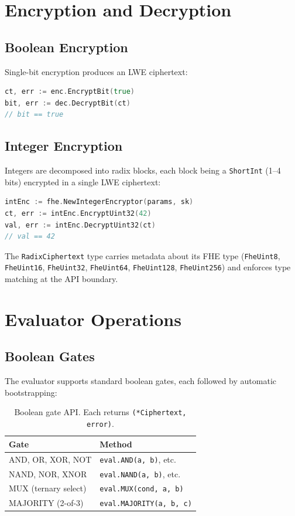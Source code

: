 \documentclass[11pt]{article}
\begin{document}
\section{Encryption and Decryption}

\subsection{Boolean Encryption}

Single-bit encryption produces an LWE ciphertext:

\begin{lstlisting}[language=Go]
ct, err := enc.EncryptBit(true)
bit, err := dec.DecryptBit(ct)
// bit == true
\end{lstlisting}

\subsection{Integer Encryption}

Integers are decomposed into radix blocks, each block being a \texttt{ShortInt} (1--4 bits) encrypted in a single LWE ciphertext:

\begin{lstlisting}[language=Go]
intEnc := fhe.NewIntegerEncryptor(params, sk)
ct, err := intEnc.EncryptUint32(42)
val, err := intEnc.DecryptUint32(ct)
// val == 42
\end{lstlisting}

The \texttt{RadixCiphertext} type carries metadata about its FHE type (\texttt{FheUint8}, \texttt{FheUint16}, \texttt{FheUint32}, \texttt{FheUint64}, \texttt{FheUint128}, \texttt{FheUint256}) and enforces type matching at the API boundary.

\section{Evaluator Operations}

\subsection{Boolean Gates}

The evaluator supports standard boolean gates, each followed by automatic bootstrapping:

\begin{table}[h]
\centering
\begin{tabular}{@{}ll@{}}
\toprule
\textbf{Gate} & \textbf{Method} \\
\midrule
AND, OR, XOR, NOT & \texttt{eval.AND(a, b)}, etc. \\
NAND, NOR, XNOR & \texttt{eval.NAND(a, b)}, etc. \\
MUX (ternary select) & \texttt{eval.MUX(cond, a, b)} \\
MAJORITY (2-of-3) & \texttt{eval.MAJORITY(a, b, c)} \\
\bottomrule
\end{tabular}
\caption{Boolean gate API. Each returns \texttt{(*Ciphertext, error)}.}
\label{tab:gates}
\end{table}
\end{document}
